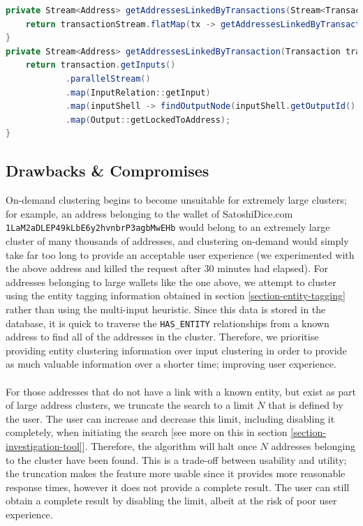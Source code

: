 \begin{lstlisting}[language=Java, caption={Java Implementation of on demand clustering}, label={lst:clustering-on-demand}, breaklines=true, basicstyle=\small]
private Stream<Address> getAddressesLinkedByTransactions(Stream<Transaction> transactionStream, Date start, Date end) {
    return transactionStream.flatMap(tx -> getAddressesLinkedByTransaction(tx, start, end));
}
private Stream<Address> getAddressesLinkedByTransaction(Transaction transaction, Date start, Date end) {
    return transaction.getInputs()
            .parallelStream()
            .map(InputRelation::getInput)
            .map(inputShell -> findOutputNode(inputShell.getOutputId(), start, end))
            .map(Output::getLockedToAddress);
}
\end{lstlisting}

\subsection{Drawbacks \& Compromises}
On-demand clustering begins to become unsuitable for extremely large clusters; for example, an address belonging to the wallet of SatoshiDice.com \\\texttt{1LaM2aDLEP49kLbE6y2hvnbrP3agbMwEHb} would belong to an extremely large cluster of many thousands of addresses, and clustering on-demand would simply take far too long to provide an acceptable user experience (we experimented with the above address and killed the request after 30 minutes had elapsed). For addresses belonging to large wallets like the one above, we attempt to cluster using the entity tagging information obtained in section \ref{section-entity-tagging} rather than using the multi-input heuristic.
Since this data is stored in the database, it is quick to traverse the \texttt{HAS\_ENTITY} relationships from a known address to find all of the addresses in the cluster. Therefore, we prioritise providing entity clustering information over input clustering in order to provide as much valuable information over a shorter time; improving user experience. \\\\
For those addresses that do not have a link with a known entity, but exist as part of large address clusters, we truncate the search to a limit $N$ that is defined by the user. The user can increase and decrease this limit, including disabling it completely, when initiating the search [see more on this in section \ref{section-investigation-tool}]. Therefore, the algorithm will halt once $N$ addresses belonging to the cluster have been found. This is a trade-off between usability and utility; the truncation makes the feature more usable since it provides more reasonable response times, however it does not provide a complete result. The user can still obtain a complete result by disabling the limit, albeit at the risk of poor user experience. 

